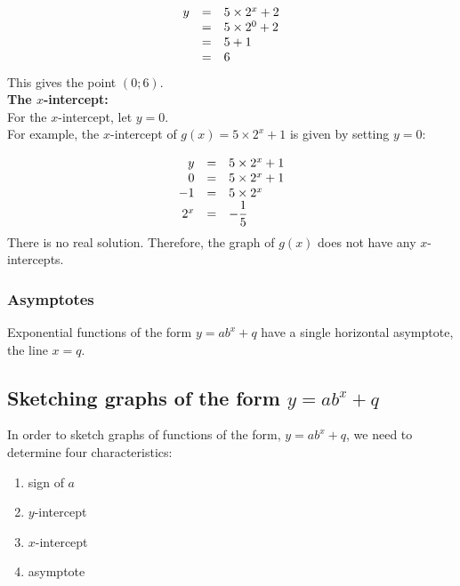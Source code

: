 \begin{equation*}
\begin{array}{ccl}\hfill y& =& 5 \times 2^{x}+2\hfill \\
 \hfill & =& 5 \times 2^{0}+2\hfill \\
 & =& 5+1\hfill \\ & =& 6\hfill 
\end{array}
\end{equation*}
This gives the point $(0;6)$.\vspace{10pt}
\\
\textbf{The $x$-intercept:}\\
For the $x$-intercept, let $y=0$. \\
For example, the $x$-intercept of $g(x)=5 \times 2^{x}+1$ is given by setting $y=0$:\par 
\begin{equation*}
\begin{array}{ccl}\hfill y& =& 5 \times 2^{x}+1\hfill \\
 \hfill 0& =& 5 \times 2^{x}+1\hfill \\
 \hfill -1& =& 5 \times 2^{x}\hfill \\
 \hfill {2}^{x}& =& -\dfrac{1}{5}\hfill 
\end{array}
\end{equation*}
There is no real solution. Therefore, the graph of $g(x)$ does not have any $x$-intercepts.\par 

\subsubsection*{Asymptotes}

Exponential functions of the form $y=ab^{x}+q$ have a single horizontal asymptote, the line $x=q$. 


\subsection*{Sketching graphs of the form $y=ab^{x}+q$}

In order to sketch graphs of functions of the form, $y=ab^{x}+q$, we need to determine four characteristics:\par 
\begin{enumerate}[noitemsep, label=\textbf{\arabic*}. ] 
\item sign of $a$
\item $y$-intercept
\item $x$-intercept
\item asymptote
\end{enumerate}

